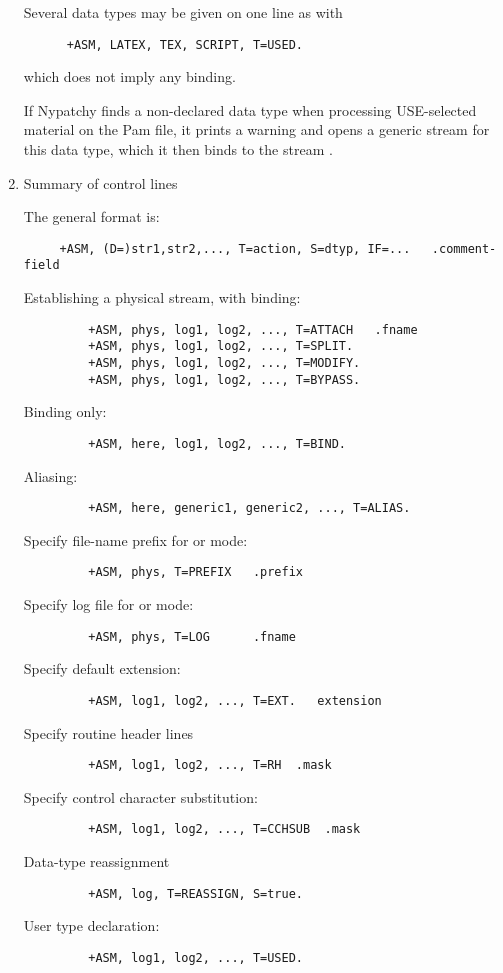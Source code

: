 \begin{enumerate}
Several data types may be given on one line as with
\begin{verbatim}
      +ASM, LATEX, TEX, SCRIPT, T=USED.
\end{verbatim}
which does not imply any binding.

If Nypatchy finds a non-declared data type when processing USE-selected
material on the Pam file, it prints a warning and opens a generic stream
for this data type, which it then binds to the stream .

\item
Summary of control lines

   The general format is:
\begin{verbatim}
     +ASM, (D=)str1,str2,..., T=action, S=dtyp, IF=...   .comment-field
\end{verbatim}
   Establishing a physical stream, with binding:
\begin{verbatim}
         +ASM, phys, log1, log2, ..., T=ATTACH   .fname
         +ASM, phys, log1, log2, ..., T=SPLIT.
         +ASM, phys, log1, log2, ..., T=MODIFY.
         +ASM, phys, log1, log2, ..., T=BYPASS.
\end{verbatim}
   Binding only:
\begin{verbatim}
         +ASM, here, log1, log2, ..., T=BIND.
\end{verbatim}
   Aliasing:
\begin{verbatim}
         +ASM, here, generic1, generic2, ..., T=ALIAS.
\end{verbatim}
   Specify file-name prefix for  or  mode:
\begin{verbatim}
         +ASM, phys, T=PREFIX   .prefix
\end{verbatim}
   Specify log file for  or  mode:
\begin{verbatim}
         +ASM, phys, T=LOG      .fname
\end{verbatim}
   Specify default extension:
\begin{verbatim}
         +ASM, log1, log2, ..., T=EXT.   extension
\end{verbatim}
   Specify routine header lines
\begin{verbatim}
         +ASM, log1, log2, ..., T=RH  .mask
\end{verbatim}
   Specify control character substitution:
\begin{verbatim}
         +ASM, log1, log2, ..., T=CCHSUB  .mask
\end{verbatim}
   Data-type reassignment
\begin{verbatim}
         +ASM, log, T=REASSIGN, S=true.
\end{verbatim}
   User type declaration:
\begin{verbatim}
         +ASM, log1, log2, ..., T=USED.
\end{verbatim}


\end{enumerate}

